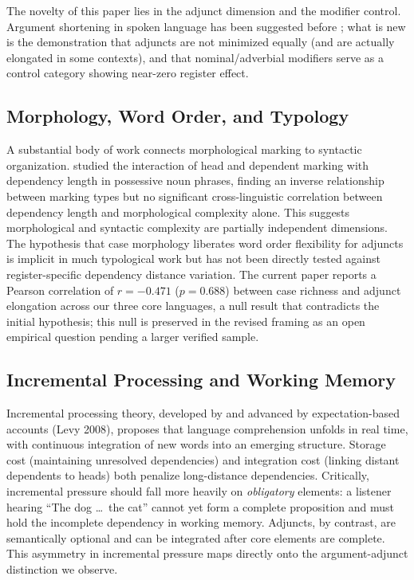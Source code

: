 \documentclass[11pt,letterpaper]{article}
\begin{document}
The novelty of this paper lies in the adjunct dimension and the modifier control. Argument shortening in spoken language has been suggested before \citep{Poiret2023}; what is new is the demonstration that adjuncts are not minimized equally (and are actually elongated in some contexts), and that nominal/adverbial modifiers serve as a control category showing near-zero register effect.

\subsection{Morphology, Word Order, and Typology}

A substantial body of work connects morphological marking to syntactic organization. \citet{Sinnemaki2023} studied the interaction of head and dependent marking with dependency length in possessive noun phrases, finding an inverse relationship between marking types but no significant cross-linguistic correlation between dependency length and morphological complexity alone. This suggests morphological and syntactic complexity are partially independent dimensions. The hypothesis that case morphology liberates word order flexibility for adjuncts is implicit in much typological work \citep{Hawkins2004,Greenberg1966} but has not been directly tested against register-specific dependency distance variation. The current paper reports a Pearson correlation of $r = -0.471$ ($p = 0.688$) between case richness and adjunct elongation across our three core languages, a null result that contradicts the initial hypothesis; this null is preserved in the revised framing as an open empirical question pending a larger verified sample.

\subsection{Incremental Processing and Working Memory}

Incremental processing theory, developed by \citet{Gibson1998} and advanced by expectation-based accounts (Levy 2008), proposes that language comprehension unfolds in real time, with continuous integration of new words into an emerging structure. Storage cost (maintaining unresolved dependencies) and integration cost (linking distant dependents to heads) both penalize long-distance dependencies. Critically, incremental pressure should fall more heavily on \emph{obligatory} elements: a listener hearing ``The dog \ldots\ the cat'' cannot yet form a complete proposition and must hold the incomplete dependency in working memory. Adjuncts, by contrast, are semantically optional and can be integrated after core elements are complete. This asymmetry in incremental pressure maps directly onto the argument-adjunct distinction we observe.
\end{document}
